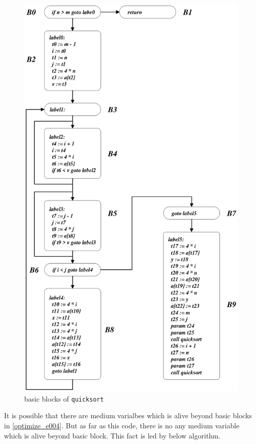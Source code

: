 \begin{figure}[htbp]
\begin{center}
\includegraphics[width=1.01\linewidth,height=1.75\linewidth]{quicksort.eps}
\caption{basic blocks of {\tt{quicksort}}}
\label{optimize_e002}
\end{center}
\end{figure}
It is possible that there are medium varialbes which is alive beyond
basic blocks in \ref{optimize_e004}. But as far as this code, there is
no any medium variable which is alive beyond basic block.
This fact is led by below algorithm.

